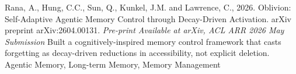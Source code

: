 
\begin{projects}

    \project
	{Rana, A., Hung, C.C., Sun, Q., Kunkel, J.M. and Lawrence, C., 2026. Oblivion: Self-Adaptive Agentic Memory Control through Decay-Driven Activation. arXiv preprint arXiv:2604.00131.}{ \textit{Pre-print Available at arXiv, ACL ARR 2026 May Submission}}
	{
    }
	{Built a cognitively-inspired memory control framework that casts forgetting as decay-driven reductions in accessibility, not explicit deletion.}
    {Agentic Memory, Long-term Memory, Memory Management}
    

\end{projects}
